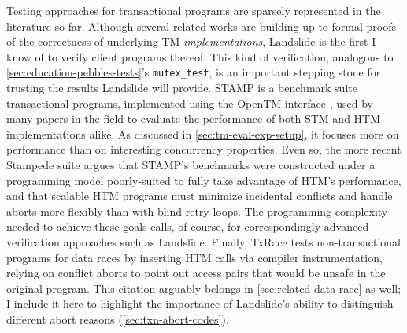 Testing approaches for transactional programs are sparsely represented in the literature so far.
Although several related works \cite{tm-correctness,tm-completeness,specifying-verifying-tm}
are building up to formal proofs of the correctness of underlying TM {\em implementations},
Landslide is the first I know of to verify client programs thereof.
This kind of verification,
analogous to \cref{sec:education-pebbles-tests}'s {\tt mutex\_test},
is an important stepping stone for trusting the results Landslide will provide.
STAMP \cite{stamp} is a benchmark suite transactional programs,
implemented using the OpenTM interface \cite{opentm},
used by many papers in the field to evaluate the performance of both STM and HTM implementations alike.
As discussed in \cref{sec:tm-eval-exp-setup},
it focuses more on performance than on interesting concurrency properties.
Even so, the more recent Stampede suite \cite{scalable-tm} argues that STAMP's benchmarks
were constructed under a programming model poorly-suited to fully take advantage of HTM's performance,
and that scalable HTM programs must
minimize incidental conflicts and handle aborts more flexibly than with blind retry loops.
The programming complexity needed to achieve these goals calls,
of course,
for correspondingly advanced verification approaches such as Landslide.
Finally, TxRace \cite{txrace}
tests non-transactional programs for data races
by inserting HTM calls via compiler instrumentation,
relying on conflict aborts to point out access pairs that would be unsafe in the original program.
This citation arguably belongs in \cref{sec:related-data-race} as well;
I include it here to highlight the importance of Landslide's
ability to distinguish different abort reasons (\cref{sec:txn-abort-codes}).

